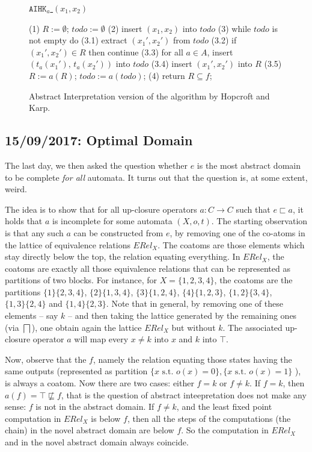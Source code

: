 \documentclass{llncs}
\begin{document}
\begin{figure}[t]
\centering
\underline{$\texttt{AIHK}_a$ $(x_1,x_2)$}
\begin{codeNT}
(1) $R := \emptyset$; $todo := \emptyset$
(2) insert $(x_1,x_2)$ into $todo$
(3) while $todo$ is not empty do 
   (3.1)  extract $(x_1',x_2')$ from $todo$
   (3.2)  if $(x_1',x_2')\in R$ then continue
   (3.3)  for all $a\in A$, 
             insert $(t_a(x_1'),\,t_a(x_2'))$ into $todo$
   (3.4)  insert $(x_1',x_2')$ into $R$ 
   (3.5) $R:= a(R)$; $todo:=a(todo)$;
(4) return $R \subseteq f$; 
\end{codeNT}
\caption{Abstract Interpretation version of the algorithm by Hopcroft and Karp.}
\label{fig:HKAI}
\end{figure}


\subsection{15/09/2017: Optimal Domain}
The last day, we then asked the question whether $e$ is the most abstract domain to be complete \emph{for all} automata. It turns out that the question is, at some extent, weird. 

The idea is to show that for all up-closure operators $a\colon C\to C$ such that $e\sqsubset a$, it holds that $a$ is incomplete for some automata $(X,o,t)$. The starting observation is that any such $a$ can be constructed from $e$, by removing one of the co-atoms in the lattice of equivalence relations $ERel_X$. The coatoms are those elements which stay directly below the top, the relation equating everything. In $ERel_X$, the coatoms are exactly all those equivalence relations that can be represented as partitions of two blocks. For instance, for $X=\{1,2,3,4\}$, the coatoms are the partitions $\{1\}\{2,3,4\}$, $\{2\}\{1,3,4\}$, $\{3\}\{1,2,4\}$, $\{4\}\{1,2,3\}$, $\{1,2\}\{3,4\}$, $\{1,3\}\{2,4\}$ and $\{1,4\}\{2,3\}$. Note that in general, by removing one of these elements -- say $k$ -- and then taking the lattice generated by the remaining ones (via $\bigsqcap$), one obtain again the lattice $ERel_X$ but without $k$. The associated up-closure operator $a$ will map every $x\neq k$ into $x$ and $k$ into $\top$. 

Now, observe that the $f$, namely the relation equating those states having the same outputs (represented as partition $\{x\text{ s.t. } o(x)=0\}, \{x \text{ s.t. } o(x)=1\}$ ),  is always a coatom. Now there are two cases: either $f=k$ or $f\neq k$. If $f=k$, then $a(f)=\top \not \sqsubseteq f$, that is the question of abstract inteepretation does not make any sense: $f$ is not in the abstract domain. If $f\neq k$, and the least fixed point computation in $ERel_X$ is below $f$, then all the steps of the computations (the chain) in the novel abstract domain are below $f$. So the computation in $ERel_X$ and in the novel abstract domain always coincide.
\end{document}
